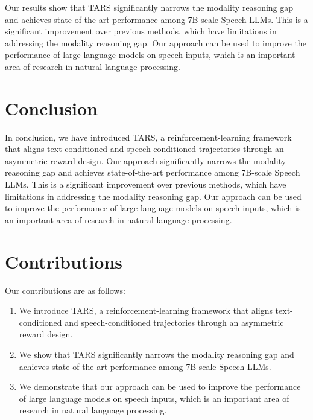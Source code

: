 \documentclass{article}
\begin{document}
Our results show that TARS significantly narrows the modality reasoning gap and achieves state-of-the-art performance among 7B-scale Speech LLMs. This is a significant improvement over previous methods, which have limitations in addressing the modality reasoning gap. Our approach can be used to improve the performance of large language models on speech inputs, which is an important area of research in natural language processing.

\section{Conclusion}

In conclusion, we have introduced TARS, a reinforcement-learning framework that aligns text-conditioned and speech-conditioned trajectories through an asymmetric reward design. Our approach significantly narrows the modality reasoning gap and achieves state-of-the-art performance among 7B-scale Speech LLMs. This is a significant improvement over previous methods, which have limitations in addressing the modality reasoning gap. Our approach can be used to improve the performance of large language models on speech inputs, which is an important area of research in natural language processing.

\section{Contributions}

Our contributions are as follows:

\begin{enumerate}
\item We introduce TARS, a reinforcement-learning framework that aligns text-conditioned and speech-conditioned trajectories through an asymmetric reward design.
\item We show that TARS significantly narrows the modality reasoning gap and achieves state-of-the-art performance among 7B-scale Speech LLMs.
\item We demonstrate that our approach can be used to improve the performance of large language models on speech inputs, which is an important area of research in natural language processing.
\end{enumerate}
\end{document}
